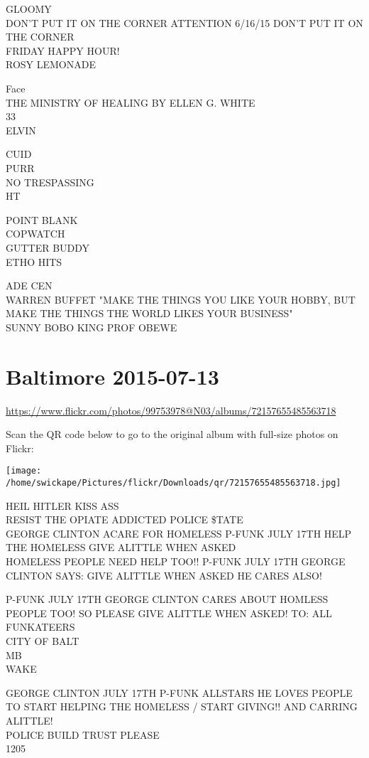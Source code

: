 \documentclass[10pt,letterpaper]{article}
\begin{document}
GLOOMY\\
DON'T PUT IT ON THE CORNER ATTENTION 6/16/15 DON'T PUT IT ON THE CORNER\\
FRIDAY HAPPY HOUR!\\
ROSY LEMONADE

Face\\
THE MINISTRY OF HEALING BY ELLEN G. WHITE\\
33\\
ELVIN

CUID\\
PURR\\
NO TRESPASSING\\
HT

POINT BLANK\\
COPWATCH\\
GUTTER BUDDY\\
ETHO HITS

ADE CEN\\
WARREN BUFFET "MAKE THE THINGS YOU LIKE YOUR HOBBY, BUT MAKE THE THINGS THE WORLD LIKES YOUR BUSINESS"\\
SUNNY BOBO KING PROF OBEWE


\section*{Baltimore 2015-07-13}

\url{https://www.flickr.com/photos/99753978@N03/albums/72157655485563718}

Scan the QR code below to go to the original album with full-size photos on Flickr:

\texttt{[image: /home/swickape/Pictures/flickr/Downloads/qr/72157655485563718.jpg]}


HEIL HITLER KISS ASS\\
RESIST THE OPIATE ADDICTED POLICE \$TATE\\
GEORGE CLINTON ACARE FOR HOMELESS P{-}FUNK JULY 17TH HELP THE HOMELESS GIVE ALITTLE WHEN ASKED\\
HOMELESS PEOPLE NEED HELP TOO!! P{-}FUNK JULY 17TH GEORGE CLINTON SAYS: GIVE ALITTLE WHEN ASKED HE CARES ALSO!

P{-}FUNK JULY 17TH GEORGE CLINTON CARES ABOUT HOMLESS PEOPLE TOO!  SO PLEASE GIVE ALITTLE WHEN ASKED!  TO: ALL FUNKATEERS\\
CITY OF BALT\\
MB\\
WAKE

GEORGE CLINTON JULY 17TH P{-}FUNK ALLSTARS HE LOVES PEOPLE TO START HELPING THE HOMELESS / START GIVING!! AND CARRING ALITTLE!\\
POLICE BUILD TRUST PLEASE\\
1205
\end{document}
